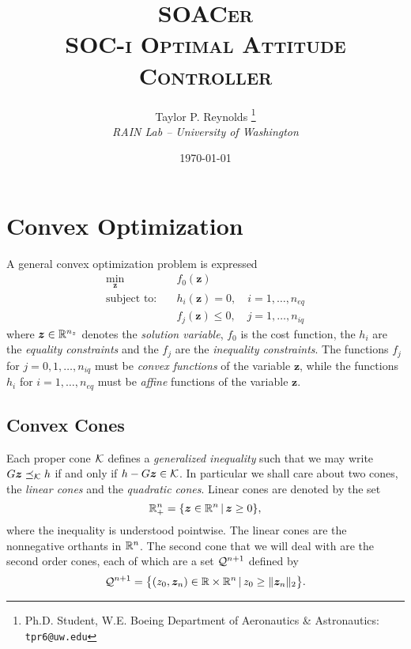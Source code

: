 \documentclass[12pt]{article}
\title{\textsc{\textbf{SOACer} \\ \textbf{S}OC-i \textbf{O}ptimal \textbf{A}ttitude \textbf{C}ontroll\textbf{er}}}
\author{
  Taylor P. Reynolds%
  \thanks{Ph.D. Student, W.E. Boeing Department of Aeronautics \& Astronautics: \texttt{tpr6@uw.edu} } 
\\
  {\normalsize\itshape
  RAIN Lab -- University of Washington}
 }
\date{\today}
\begin{document}
 
\maketitle

\section{Convex Optimization}

A general convex optimization problem is expressed
\begin{subequations}
\begin{align}
\min_{\bm{z}} &\quad f_0(\bm{z}) \\
\text{subject to:} &\quad h_i(\bm{z}) = 0, \quad i=1,\ldots,n_{eq} \\
&\quad f_j(\bm{z}) \leq 0, \quad j = 1,\ldots,n_{iq}
\end{align}
\end{subequations}
where $\bm{z}\in{\mathbb{R}}^{n_z}$ denotes the \textit{solution variable}, $f_0$ is the cost function, the $h_i$ are the \textit{equality constraints} and the $f_j$ are the \textit{inequality constraints}. The functions $f_j$ for $j=0,1,\ldots,n_{iq}$ must be \textit{convex functions} of the variable $\bm{z}$, while the functions $h_i$ for $i=1,\ldots,n_{eq}$ must be \textit{affine} functions of the variable $\bm{z}$.

\subsection{Convex Cones}

Each proper cone $\mathcal{K}$ defines a \textit{generalized inequality} such that we may write $G \bm{z} \preceq_{\mathcal{K}} h$ if and only if $h - G \bm{z} \in \mathcal{K}$. In particular we shall care about two cones, the \textit{linear cones} and the \textit{quadratic cones}. Linear cones are denoted by the set 
\begin{equation}
{\mathbb{R}}_+^{n} = \{ \bm{z}\in{\mathbb{R}}^n \,|\, \bm{z} \geq 0 \},
\label{eq:lcone_set}
\end{equation}
where the inequality is understood pointwise. The linear cones are the nonnegative orthants in ${\mathbb{R}}^n$. The second cone that we will deal with are the second order cones, each of which are a set $\mathcal{Q}^{n+1}$ defined by
\begin{equation}
\mathcal{Q}^{n+1} = \big\{ (z_0,\bm{z}_n)\in{\mathbb{R}}\times{\mathbb{R}}^n \,|\, z_0 \geq \| \bm{z}_n \|_2 \big\}.
\label{eq:soc_set}
\end{equation}
\end{document}
